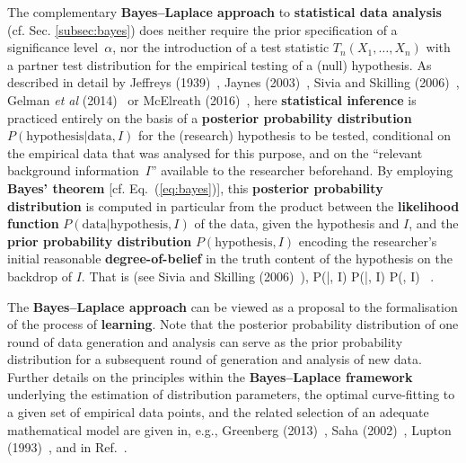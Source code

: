 \medskip
\noindent
The complementary \textbf{Bayes--Laplace approach} to 
\textbf{statistical data analysis} (cf. Sec. \ref{subsec:bayes}) 
does neither require the prior specification of a significance 
level~$\alpha$, nor the introduction of a test statistic 
$T_{n}(X_{1}, \ldots, X_{n})$ with a partner test distribution for
the empirical testing of a (null) hypothesis. As described in
detail by Jeffreys (1939)~, Jaynes (2003)~,
Sivia and Skilling (2006)~, Gelman \textit{et al}
(2014)~ or McElreath (2016)~, here
\textbf{statistical inference} is practiced entirely on the basis
of a \textbf{posterior probability distribution}
$P(\text{hypothesis}|\text{data}, I)$ for
the (research) hypothesis to be tested, conditional on the
empirical data that was analysed for this purpose, and on the
``relevant background information~$I$'' available to the researcher 
beforehand. By employing \textbf{Bayes' theorem} [cf. 
Eq.~(\ref{eq:bayes})], this \textbf{posterior probability 
distribution} is computed in particular from the product between 
the \textbf{likelihood function} $P(\text{data}|\text{hypothesis}, 
I)$ of the data, given the hypothesis and $I$, and the
\textbf{prior probability distribution} $P(\text{hypothesis}, I)$ 
encoding the researcher's initial reasonable
\textbf{degree-of-belief} in the truth content of the hypothesis on
the backdrop of $I$. That is (see Sivia and Skilling
(2006)~),
%
\be
P(|, I) \propto 
P(|, I) \times P(, I) 
\ .
\ee
%

\medskip
\noindent
The \textbf{Bayes--Laplace approach} can be viewed as a proposal to 
the formalisation of the process of \textbf{learning}. Note that
the posterior probability distribution of one round of data
generation and analysis can serve as the prior probability
distribution for a subsequent round of generation and analysis of
new data. Further details on the principles within the
\textbf{Bayes--Laplace framework} underlying the estimation of
distribution parameters, the optimal curve-fitting to a given set
of empirical data points, and the related selection of an adequate mathematical model are given in, e.g., Greenberg
(2013)~, Saha (2002)~,
Lupton (1993)~, and in Ref.~.


